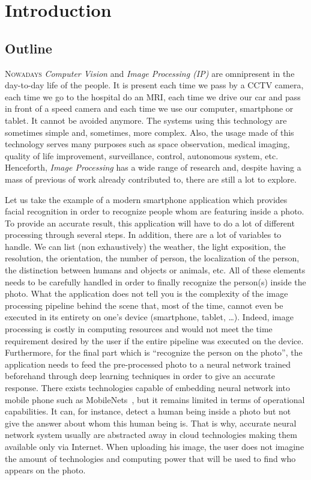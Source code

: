 \chapter{Introduction}
\label{chap:introduction}

\section*{Outline}

\lettrine[lines=2]{N}{owadays} \emph{Computer Vision} and \emph{Image Processing (IP)} are omnipresent in the day-to-day
life of the people. It is present each time we pass by a CCTV camera, each time we go to the hospital do an MRI, each
time we drive our car and pass in front of a speed camera and each time we use our computer, smartphone or tablet. It
cannot be avoided anymore. The systems using this technology are sometimes simple and, sometimes, more complex. Also,
the usage made of this technology serves many purposes such as space observation, medical imaging, quality of life
improvement, surveillance, control, autonomous system, etc. Henceforth, \emph{Image Processing} has a wide range of
research and, despite having a mass of previous of work already contributed to, there are still a lot to explore.

Let us take the example of a modern smartphone application which provides facial recognition in order to recognize
people whom are featuring inside a photo. To provide an accurate result, this application will have to do a lot of
different processing through several steps. In addition, there are a lot of variables to handle. We can list (non
exhaustively) the weather, the light exposition, the resolution, the orientation, the number of person, the localization
of the person, the distinction between humans and objects or animals, etc. All of these elements needs to be carefully
handled in order to finally recognize the person(s) inside the photo. What the application does not tell you is the
complexity of the image processing pipeline behind the scene that, most of the time, cannot even be executed in its
entirety on one's device (smartphone, tablet, \ldots). Indeed, image processing is costly in computing resources and
would not meet the time requirement desired by the user if the entire pipeline was executed on the device. Furthermore,
for the final part which is ``recognize the person on the photo'', the application needs to feed the pre-processed photo
to a neural network trained beforehand through deep learning techniques in order to give an accurate response. There
exists technologies capable of embedding neural network into mobile phone such as
MobileNets~\parencite{howard.2017.mobilenets}, but it remains limited in terms of operational capabilities. It can, for
instance, detect a human being inside a photo but not give the answer about whom this human being is. That is why,
accurate neural network system usually are abstracted away in cloud technologies making them available only via
Internet. When uploading his image, the user does not imagine the amount of technologies and computing power that will
be used to find who appears on the photo.

